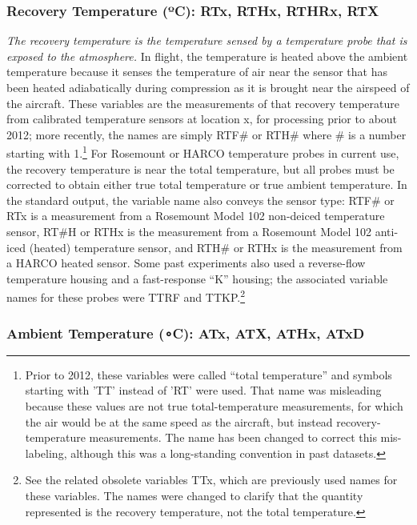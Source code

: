 \documentclass[
]{book}
\begin{document}
\hypertarget{recovery-t}{%
\subsubsection*{\texorpdfstring{Recovery Temperature ({º}C): RTx, RTHx, RTHRx, RTX}{Recovery Temperature (ºC): RTx, RTHx, RTHRx, RTX}}\label{recovery-t}}

\emph{The recovery temperature is the temperature sensed by a temperature probe that is exposed to the atmosphere.} In flight, the temperature is heated above the ambient temperature because it senses the temperature of air near the sensor that has been heated adiabatically during compression as it is brought near the airspeed of the aircraft. These variables are the measurements of that recovery temperature from calibrated temperature sensors at location x, for processing prior to about 2012; more recently, the names are simply RTF\# or RTH\# where \# is a number starting with 1.\footnote{Prior to 2012, these variables were called ``total temperature'' and symbols starting with 'TT' instead of 'RT' were used. That name was misleading because these values are not true total-temperature measurements, for which the air would be at the same speed as the aircraft, but instead recovery-temperature measurements. The name has been changed to correct this mis-labeling, although this was a long-standing convention in past datasets.}
For Rosemount or HARCO temperature probes in current use, the recovery temperature is near the total temperature, but all probes must be corrected to obtain either true total temperature or true ambient temperature. In the standard output, the variable name also conveys the sensor type: RTF\# or RTx is a measurement from a Rosemount Model 102 non-deiced temperature sensor, RT\#H or RTHx is the measurement from a Rosemount Model 102 anti-iced (heated) temperature sensor, and RTH\# or RTHx is the measurement from a HARCO heated sensor. Some past experiments also used a reverse-flow temperature housing and a fast-response ``K'' housing; the associated variable names for these probes were TTRF and TTKP.\footnote{See the related obsolete variables TTx, which are previously used names for these variables. The names were changed to clarify that the quantity represented is the recovery temperature, not the total temperature.}

\hypertarget{ambient-t}{%
\subsubsection*{\texorpdfstring{Ambient Temperature ({∘}C): ATx, ATX, ATHx, ATxD}{Ambient Temperature (∘C): ATx, ATX, ATHx, ATxD}}\label{ambient-t}}
\end{document}

